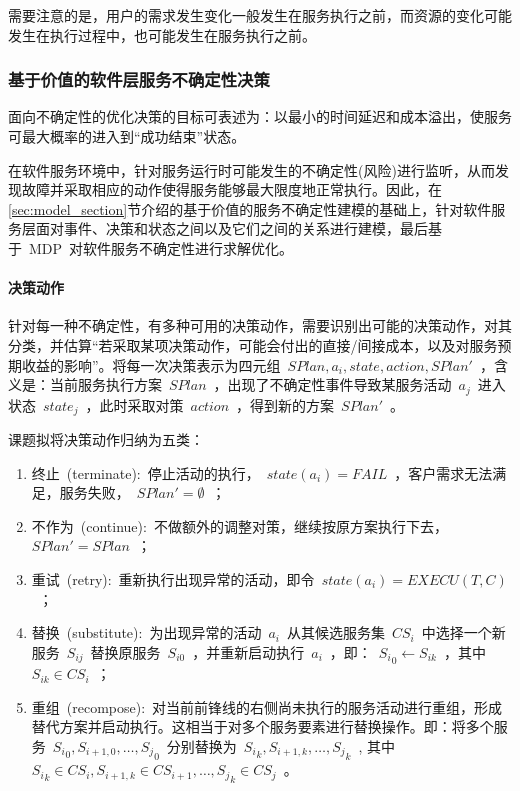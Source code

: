 需要注意的是，用户的需求发生变化一般发生在服务执行之前，而资源的变化可能发生在执行过程中，也可能发生在服务执行之前。
%
%
%
%
%


\subsubsection{基于价值的软件层服务不确定性决策}

面向不确定性的优化决策的目标可表述为：以最小的时间延迟和成本溢出，使服务可最大概率的进入到“成功结束”状态。

在软件服务环境中，针对服务运行时可能发生的不确定性(风险)进行监听，从而发现故障并采取相应的动作使得服务能够最大限度地正常执行。因此，在\ref{sec:model_section}节介绍的基于价值的服务不确定性建模的基础上，针对软件服务层面对事件、决策和状态之间以及它们之间的关系进行建模，最后基于~MDP~对软件服务不确定性进行求解优化。

\setcounter{paragraph}{0}
\paragraph{决策动作}

针对每一种不确定性，有多种可用的决策动作，需要识别出可能的决策动作，对其分类，并估算“若采取某项决策动作，可能会付出的直接/间接成本，以及对服务预期收益的影响”。将每一次决策表示为四元组~$SPlan,{a_i},state,action,SPlan'$~，含义是：当前服务执行方案~$SPlan$~，出现了不确定性事件导致某服务活动~$a_j$~进入状态~$state_j$~，此时采取对策~$action$~，得到新的方案~$SPlan'$~。

课题拟将决策动作归纳为五类：
\begin{enumerate}
    \item 终止~(terminate):~停止活动的执行，~$state(a_i)=FAIL$~，客户需求无法满足，服务失败，~$SPlan'=\emptyset $~；
    \item 不作为~(continue):~不做额外的调整对策，继续按原方案执行下去，~$SPlan'=SPlan$~；
    \item 重试~(retry):~重新执行出现异常的活动，即令~$state(a_i)=EXECU(T, C)$~；
    \item 替换~(substitute):~为出现异常的活动~$a_i$~从其候选服务集~$CS_i$~中选择一个新服务~$S_{ij}$~替换原服务~$S_{i0}$~，并重新启动执行~$a_i$~，即：~${S_i}_0 \leftarrow {S_{ik}}$~，其中~${S_{ik}} \in C{S_i}$~；
    \item 重组~(recompose):~对当前前锋线的右侧尚未执行的服务活动进行重组，形成替代方案并启动执行。这相当于对多个服务要素进行替换操作。即：将多个服务~${S_i}_0,{S_{i + 1,0}}, \ldots ,{S_j}_0$~分别替换为~${S_i}_k,{S_{i + 1,k}}, \ldots ,{S_j}_k$~, 其中~${S_i}_k \in C{S_i},{S_{i + 1,k}} \in C{S_{i + 1}}, \ldots ,{S_j}_k \in C{S_j}$~。
\end{enumerate}

